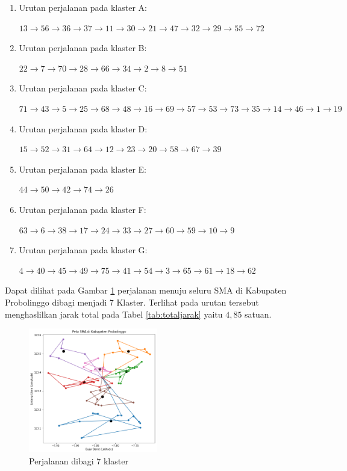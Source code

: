 \begin{enumerate}

\item Urutan perjalanan pada klaster A:

$13\rightarrow56\rightarrow36\rightarrow37\rightarrow11\rightarrow30\rightarrow21\rightarrow47\rightarrow32\rightarrow29\rightarrow55\rightarrow72$

\item Urutan perjalanan pada klaster B:

$22\rightarrow7\rightarrow70\rightarrow28\rightarrow66\rightarrow34\rightarrow2\rightarrow8\rightarrow51$

\item Urutan perjalanan pada klaster C:

$71\rightarrow43\rightarrow5\rightarrow25\rightarrow68\rightarrow48\rightarrow16\rightarrow69\rightarrow57\rightarrow53\rightarrow73\rightarrow35\rightarrow14\rightarrow46\rightarrow1\rightarrow19$

\item Urutan perjalanan pada klaster D:

$15\rightarrow52\rightarrow31\rightarrow64\rightarrow12\rightarrow23\rightarrow20\rightarrow58\rightarrow67\rightarrow39$

\item Urutan perjalanan pada klaster E:

$44\rightarrow50\rightarrow42\rightarrow74\rightarrow26$

\item Urutan perjalanan pada klaster F:

$63\rightarrow6\rightarrow38\rightarrow17\rightarrow24\rightarrow33\rightarrow27\rightarrow60\rightarrow59\rightarrow10\rightarrow9$

\item Urutan perjalanan pada klaster G:

$4\rightarrow40\rightarrow45\rightarrow49\rightarrow75\rightarrow41\rightarrow54\rightarrow3\rightarrow65\rightarrow61\rightarrow18\rightarrow62$

\end{enumerate}

Dapat dilihat pada Gambar \ref{fig:hasil_mtsp7} perjalanan menuju seluru SMA di Kabupaten Probolinggo dibagi menjadi 7 Klaster. Terlihat pada urutan tersebut menghaslilkan jarak total pada Tabel \ref{tab:totaljarak} yaitu $4,85$ satuan.

\begin{figure}[H]
\centering
\includegraphics[width=0.5\textwidth]{Gambar/hasil_mtsp/7}
\caption{Perjalanan dibagi 7 klaster}
\label{fig:hasil_mtsp7}
\end{figure}


